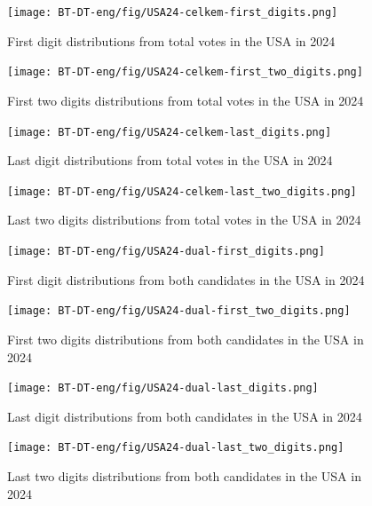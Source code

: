 \begin{figure}[h]
    \centering
    \caption{First digit distributions from total votes in the USA in 2024}
    \texttt{[image: BT-DT-eng/fig/USA24-celkem-first\_digits.png]}
    \label{fig:USA24-celkem-first_digits}
\end{figure}

\begin{figure}[h]
    \centering
    \caption{First two digits distributions from total votes in the USA in 2024}
    \texttt{[image: BT-DT-eng/fig/USA24-celkem-first\_two\_digits.png]}
    \label{fig:USA24-celkem-first_two_digits}
\end{figure}

\begin{figure}[h]
    \centering
    \caption{Last digit distributions from total votes in the USA in 2024}
    \texttt{[image: BT-DT-eng/fig/USA24-celkem-last\_digits.png]}
    \label{fig:USA24-celkem-first_digits}
\end{figure}

\begin{figure}[h]
    \centering
    \caption{Last two digits distributions from total votes in the USA in 2024}
    \texttt{[image: BT-DT-eng/fig/USA24-celkem-last\_two\_digits.png]}
    \label{fig:USA24-celkem-last_two_digits}
\end{figure}

\begin{figure}[h]
    \centering
    \caption{First digit distributions from both candidates in the USA in 2024}
    \texttt{[image: BT-DT-eng/fig/USA24-dual-first\_digits.png]}
    \label{fig:USA24-dual-first_digits}
\end{figure}

\begin{figure}[h]
    \centering
    \caption{First two digits distributions from both candidates in the USA in 2024}
    \texttt{[image: BT-DT-eng/fig/USA24-dual-first\_two\_digits.png]}
    \label{fig:USA24-dual-first_two_digits}
\end{figure}

\begin{figure}[h]
    \centering
    \caption{Last digit distributions from both candidates in the USA in 2024}
    \texttt{[image: BT-DT-eng/fig/USA24-dual-last\_digits.png]}
    \label{fig:USA24-dual-last_digits}
\end{figure}


\begin{figure}[h]
    \centering
    \caption{Last two digits distributions from both candidates in the USA in 2024}
    \texttt{[image: BT-DT-eng/fig/USA24-dual-last\_two\_digits.png]}
    \label{fig:USA24-dual-last_two_digits}
\end{figure}





